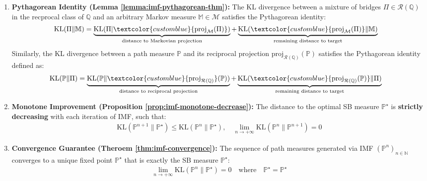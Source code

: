 \documentclass{article}
\newcommand{\bluetext}[1]{\textcolor{customblue}{#1}}
\begin{document}
\begin{enumerate}
    \item [(i)] \textbf{Pythagorean Identity (Lemma \ref{lemma:imf-pythagorean-thm}):} The KL divergence between a mixture of bridges $\Pi\in \mathcal{R}(\mathbb{Q})$ in the recprocal class of $\mathbb{Q}$ and an arbitrary Markov measure $\mathbb{M}\in \mathcal{M}$ satisfies the Pythagorean identity:
    \begin{align}
        \text{KL}(\Pi\|\mathbb{M})&=\underbrace{\text{KL}(\Pi|\bluetext{\text{proj}_{\mathcal{M}}(\Pi)})}_{\text{distance to Markovian projection}}+\underbrace{\text{KL}(\bluetext{\text{proj}_{\mathcal{M}}(\Pi)}\|\mathbb{M})}_{\text{remaining distance to target}}
    \end{align}
    Similarly, the KL divergence between a path measure $\mathbb{P}$ and its reciprocal projection $\text{proj}_{\mathcal{R}(\mathbb{Q})}(\mathbb{P})$ satisfies the Pythagorean identity defined as: 
    \begin{align}
        \text{KL}(\mathbb{P}\|\Pi)&=\underbrace{\text{KL}(\mathbb{P}\|\bluetext{\text{proj}_{\mathcal{R}(\mathbb{Q})}}(\mathbb{P}))}_{\text{distance to reciprocal projection}}+\underbrace{\text{KL}(\bluetext{\text{proj}_{\mathcal{R}(\mathbb{Q})}(\mathbb{P})}\|\Pi)}_{\text{remaining distance to target}}
    \end{align}
    \item[(ii)] \textbf{Monotone Improvement (Proposition \ref{prop:imf-monotone-decrease}):} The distance to the optimal SB measure $\mathbb{P}^\star$ is \textbf{strictly decreasing} with each iteration of IMF, such that:
    \begin{align}
        \text{KL}\left(\mathbb{P}^{n+1}\|\mathbb{P}^\star\right)\leq \text{KL}\left(\mathbb{P}^n\|\mathbb{P}^\star\right), \quad \lim_{n\to +\infty}\text{KL}\left(\mathbb{P}^{n}\|\mathbb{P}^{n+1}\right)=0
    \end{align}
    \item[(iii)] \textbf{Convergence Guarantee (Theroem \ref{thm:imf-convergence}):} The sequence of path measures generated via IMF $(\mathbb{P}^n)_{n\in \mathbb{N}}$ converges to a unique fixed point $\mathbb{P}^\star$ that is exactly the SB measure $\mathbb{P}^\star$:
    \begin{align}
        \lim_{n\to +\infty}\text{KL}\left(\mathbb{P}^{n}\|\mathbb{P}^\star\right)=0 \quad \text{where} \quad \mathbb{P}^\star=\mathbb{P}^\star
    \end{align}
\end{enumerate}
\end{document}

